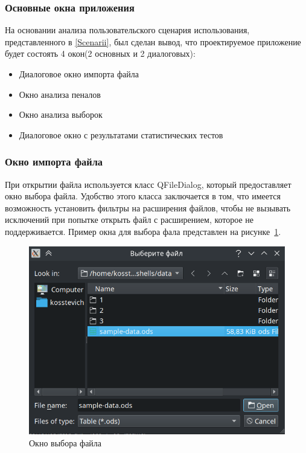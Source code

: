 \subsubsection{Основные окна приложения}

На основании анализа пользовательского сценария использования, представленного в \ref{Scenarii}, был сделан вывод, что проектируемое приложение будет состоять 4 окон(2 основных и 2 диалоговых):

\begin{itemize}
	\item Диалоговое окно импорта файла
	\item Окно анализа пеналов
	\item Окно анализа выборок
	\item Диалоговое окно с результатами статистических тестов 
\end{itemize}



\subsubsection{Окно импорта файла}

При открытии файла используется класс QFileDialog, который предоставляет окно выбора файла. Удобство этого класса заключается в том, что имеется возможность установить фильтры на расширения файлов, чтобы не вызывать исключений при попытке открыть файл с расширением, которое не поддерживается. Пример окна для выбора фала представлен на рисунке~\ref{fig:ris7}.

\begin{figure}[H]
	\centering
	\includegraphics[width=1\linewidth]{pics/ris7} %
	\caption{Окно выбора файла}
	\label{fig:ris7} %
\end{figure}

